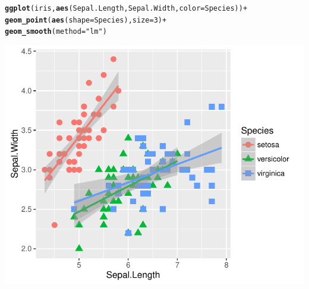 \documentclass{beamer}\usepackage[]{graphicx}\usepackage[]{color}
\makeatletter
\newcommand{\hlnum}[1]{\textcolor[rgb]{0.686,0.059,0.569}{#1}}%
\newcommand{\hlstr}[1]{\textcolor[rgb]{0.192,0.494,0.8}{#1}}%
\newcommand{\hlopt}[1]{\textcolor[rgb]{0,0,0}{#1}}%
\newcommand{\hlstd}[1]{\textcolor[rgb]{0.345,0.345,0.345}{#1}}%
\newcommand{\hlkwc}[1]{\textcolor[rgb]{0.333,0.667,0.333}{#1}}%
\newcommand{\hlkwd}[1]{\textcolor[rgb]{0.737,0.353,0.396}{\textbf{#1}}}%
\newenvironment{kframe}{%
 \def\at@end@of@kframe{}%
 \ifinner\ifhmode%
  \def\at@end@of@kframe{\end{minipage}}%
  \begin{minipage}{\columnwidth}%
 \fi\fi%
 \def\FrameCommand##1{\hskip\@totalleftmargin \hskip-\fboxsep
 \colorbox{shadecolor}{##1}\hskip-\fboxsep
     \hskip-\linewidth \hskip-\@totalleftmargin \hskip\columnwidth}%
 \MakeFramed {\advance\hsize-\width
   \@totalleftmargin\z@ \linewidth\hsize
   \@setminipage}}%
 {\par\unskip\endMakeFramed%
 \at@end@of@kframe}
\newenvironment{knitrout}{}{} %
\makeatother
\begin{document}
\begin{frame}[fragile]
\begin{knitrout}\footnotesize
{}\color{fgcolor}\begin{kframe}
\begin{alltt}
\hlkwd{ggplot}\hlstd{(iris,} \hlkwd{aes}\hlstd{(Sepal.Length, Sepal.Width,} \hlkwc{color} \hlstd{= Species))} \hlopt{+}
    \hlkwd{geom_point}\hlstd{(}\hlkwd{aes}\hlstd{(}\hlkwc{shape} \hlstd{= Species),} \hlkwc{size} \hlstd{=} \hlnum{3}\hlstd{)} \hlopt{+}
    \hlkwd{geom_smooth}\hlstd{(}\hlkwc{method} \hlstd{=} \hlstr{"lm"}\hlstd{)}
\end{alltt}
\end{kframe}

{\centering \includegraphics[width=.75\linewidth]{figure/adding_stats-1} 

}



\end{knitrout}
\end{frame}

\end{document}
